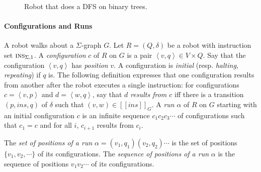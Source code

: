 \documentclass{aamas2015}
\def\dir{\textrm{Dir}}
\def\go{\textsf{go}}
\def\deg{\textsf{deg}}
\def\collide{\textsf{collide}}
\newcommand{\tpl}[1]{\left<{#1}\right>}
\def\ins{\textsc{ins}}
\newcommand{\sr}[1]{\footnote{{\color{red} Note. #1}}}
\begin{document}
\begin{figure}[htbp] 
\centering

\caption{Robot that does a DFS on binary trees.}
\label{fig:dfs}
%    
%
%    
\end{figure}


\paragraph{Configurations and Runs}
A robot walks about a $\Sigma$-graph $G$. Let $R = (Q,\delta)$ be a robot with instruction set $\ins_{\Sigma,1}$. A {\em configuration} $c$ of $R$ on  $G$ is a pair $\tpl{ {v}, {q}} \in V \times Q$. Say that the configuration $\tpl{v,q}$ has {\em position} $v$. A configuration is {\em initial} (resp. {\em halting, repeating}) if $q$ is. The following definition expresses that one configuration results from another after the robot executes a single instruction: for configurations $c = \tpl{v,p}$ and $d = \tpl{w,q}$, say that {\em $d$ results from $c$} iff there is a transition $(p,ins,q)$ of $\delta$ such that $(v,w) \in [[ins]]_G$. 
A {\em run} $\alpha$ of $R$ on $G$ starting with an initial configuration $c$ is an infinite sequence $c_1 c_2 c_3 \cdots$ of configurations  such that $c_1 = c$ and for all $i$, $c_{i+1}$ results from $c_i$.



 The {\em set of positions of a run} $\alpha = (v_1,q_1) (v_2,q_2) \cdots $ is the set of positions $\{v_1,v_2,\cdots\}$ of its configurations. The {\em sequence of positions of a run} $\alpha$ is the sequence of positions $v_1 v_2 \cdots$ of its configurations. 
%
\end{document}
